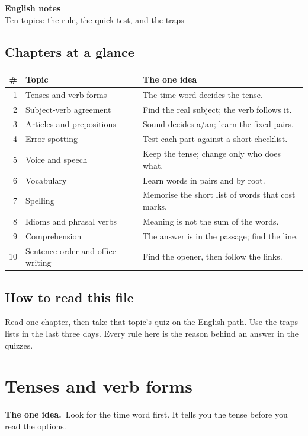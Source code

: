 \documentclass[11pt,a4paper]{article}
\let\oldsection\section
\renewcommand{\section}{\clearpage\oldsection}
\newcommand{\oneidea}[1]{\par\medskip\noindent\begingroup\setlength{\fboxsep}{7pt}%
  \colorbox{codebg}{\parbox{\dimexpr\linewidth-14pt\relax}{\textbf{\color{ember}The one idea.}\ #1}}\endgroup\par\medskip}
\begin{document}
\begin{center}
{\LARGE\bfseries\color{slate}English notes}\\[3pt]
{\color{ember}Ten topics: the rule, the quick test, and the traps}
\end{center}

\subsection*{Chapters at a glance}
\begin{center}\small\renewcommand{\arraystretch}{1.25}
\begin{tabularx}{\linewidth}{@{}r >{\raggedright\arraybackslash}p{4.2cm} >{\raggedright\arraybackslash}X@{}}
\toprule
\textbf{\#} & \textbf{Topic} & \textbf{The one idea}\\
\midrule
1 & Tenses and verb forms & The time word decides the tense.\\
2 & Subject-verb agreement & Find the real subject; the verb follows it.\\
3 & Articles and prepositions & Sound decides a/an; learn the fixed pairs.\\
4 & Error spotting & Test each part against a short checklist.\\
5 & Voice and speech & Keep the tense; change only who does what.\\
6 & Vocabulary & Learn words in pairs and by root.\\
7 & Spelling & Memorise the short list of words that cost marks.\\
8 & Idioms and phrasal verbs & Meaning is not the sum of the words.\\
9 & Comprehension & The answer is in the passage; find the line.\\
10 & Sentence order and office writing & Find the opener, then follow the links.\\
\bottomrule
\end{tabularx}
\end{center}

\subsection*{How to read this file}
Read one chapter, then take that topic's quiz on the English path. Use the traps lists in the last three days. Every rule here is the reason behind an answer in the quizzes.

\section{Tenses and verb forms}
\oneidea{Look for the time word first. It tells you the tense before you read the options.}
\end{document}
